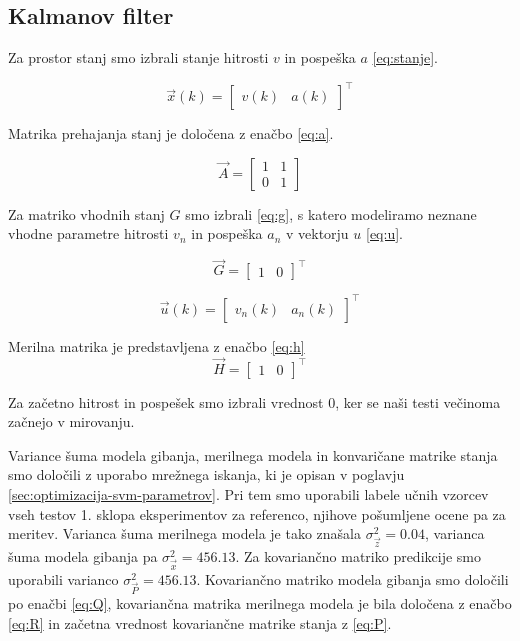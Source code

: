 \subsection{Kalmanov filter}
Za prostor stanj smo izbrali stanje hitrosti $v$ in pospeška $a$ \eqref{eq:stanje}. 

\begin{equation}
\vec{x}(k) = \begin{bmatrix}
					v(k) & a(k)
				\end{bmatrix}^\top 
                \label{eq:stanje}
\end{equation}

Matrika prehajanja stanj je določena z enačbo \eqref{eq:a}.

\begin{equation}
\vec{A} = \begin{bmatrix}
				1 & 1 \\
                0 & 1
			\end{bmatrix} 
            \label{eq:a}
\end{equation}

Za matriko vhodnih stanj $G$ smo izbrali \eqref{eq:g}, s katero modeliramo neznane vhodne parametre hitrosti $v_n$ in pospeška $a_n$ v vektorju $u$ \eqref{eq:u}. 

\begin{equation}
\vec{G} = \begin{bmatrix}
				1 & 0
			\end{bmatrix}^\top 
            \label{eq:g}
\end{equation}

\begin{equation}
\vec{u}(k) = \begin{bmatrix}
					v_{n}(k) & a_n(k)
				\end{bmatrix}^\top 
                \label{eq:u}
\end{equation}


Merilna matrika je predstavljena z enačbo \eqref{eq:h}
\begin{equation}
\vec{H} = \begin{bmatrix}
				1 & 0
			\end{bmatrix}^\top 
            \label{eq:h}
\end{equation}

Za začetno hitrost in pospešek smo izbrali vrednost $0$, ker se naši testi večinoma začnejo v mirovanju. 

Variance šuma modela gibanja, merilnega modela in konvaričane matrike stanja smo določili z uporabo mrežnega iskanja, ki je opisan v poglavju \ref{sec:optimizacija-svm-parametrov}. Pri tem smo uporabili labele učnih vzorcev vseh testov 1. sklopa eksperimentov za referenco, njihove pošumljene ocene pa za meritev. Varianca šuma merilnega modela je tako znašala $\sigma_\vec{z}^2 = 0.04$, varianca šuma modela gibanja pa $\sigma_\vec{x}^2 = 456.13$. Za kovariančno matriko predikcije smo uporabili varianco $\sigma_\vec{P}^2 = 456.13$. Kovariančno matriko modela gibanja smo določili po enačbi \eqref{eq:Q}, kovariančna matrika merilnega modela je bila določena z enačbo \eqref{eq:R} in začetna vrednost kovariančne matrike stanja z \eqref{eq:P}.

